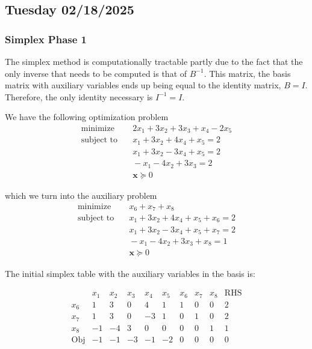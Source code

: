 \subsection{Tuesday 02/18/2025}
\subsubsection{Simplex Phase 1}
The simplex method is computationally tractable partly due to the fact that the only inverse that needs to be computed is that of $B^{-1}$.
This matrix, the basis matrix with auxiliary variables ends up being equal to the identity matrix, $B = I$.
Therefore, the only identity necessary is $I^{-1} = I$.

We have the following optimization problem
\begin{align}
  \text{minimize} & \quad 2 x_1 + 3 x_2 + 3 x_3 + x_4 - 2 x_5 \\
  \text{subject to} & \quad x_1 + 3x_2 + 4 x_4 + x_5 = 2 \\
  & \quad x_1 + 3x_2 - 3x_4 + x_5 = 2 \\
  & \quad - x_1 - 4 x_2 + 3x_3 = 2 \\
  & \quad \textbf{x} \succeq 0 
\end{align}

which we turn into the auxiliary problem
\begin{align}
  \text{minimize} & \quad x_6 + x_7 + x_8 \\
  \text{subject to} & \quad x_1 + 3x_2 + 4 x_4 + x_5 + x_6 = 2 \\
  & \quad x_1 + 3x_2 - 3x_4 + x_5 + x_7 = 2 \\
  & \quad - x_1 - 4 x_2 + 3x_3 + x_8 = 1 \\
  & \quad \textbf{x} \succeq 0
\end{align}

The initial simplex table with the auxiliary variables in the basis is:

\[ 
\begin{array}{c|cccccccc|c}
 & x_1 & x_2 & x_3 & x_4 & x_5 & x_6 & x_7 & x_8 & \text{RHS} \\
\hline
x_6 & 1 & 3 & 0 & 4 & 1 & 1 & 0 & 0 & 2 \\
x_7 & 1 & 3 & 0 & -3 & 1 & 0 & 1 & 0 & 2 \\
x_8 & -1 & -4 & 3 & 0 & 0 & 0 & 0 & 1 & 1 \\
\hline
\text{Obj} & -1 & -1 & -3 & -1 & -2 & 0 & 0 & 0 & 0 \\
\end{array}
\]

